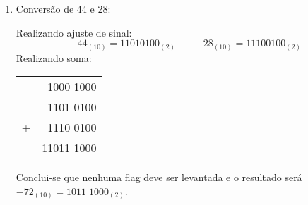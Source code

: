 \documentclass{article}
\begin{document}
\begin{resolution}
\begin{enumerate}
                    \item Conversão de 44 e 28:
                        \begin{figure}[H]
                            \centering
                        \end{figure}
                    Realizando ajuste de sinal:
                        \begin{equation*}
                            \boxed{-44_{(10)} = 11010100_{(2)}}
                            \qquad
                            \boxed{-28_{(10)} = 11100100_{(2)}}
                        \end{equation*}
                    Realizando soma:
                        \begin{table}[H]
                            \centering  
                            \begin{tabular}[]{cr}
                                  & 1000 1000\\
                                  & 1101 0100\\
                                + & 1110 0100\\\hline
                                  &11011 1000\\
                            \end{tabular}
                        \end{table}
                    Conclui-se que nenhuma flag deve ser levantada e o resultado será $\boxed{-72_{(10)} = 1011\;1000_{(2)}}$.
\newpage


\end{enumerate}
\end{resolution}
\end{document}
